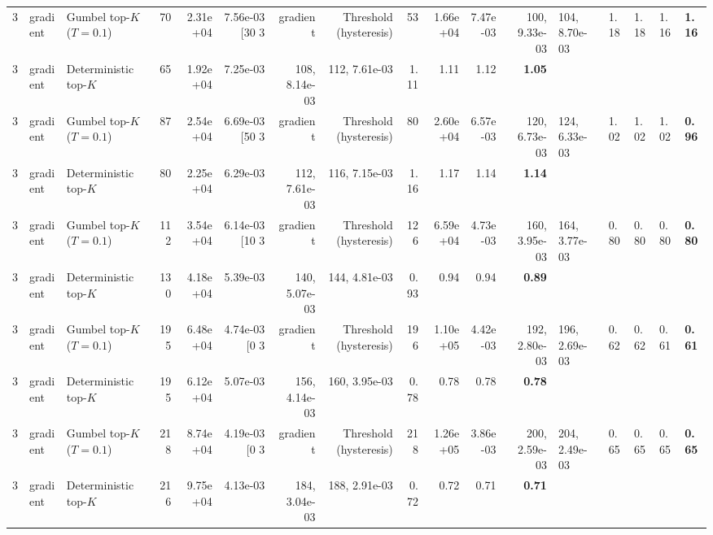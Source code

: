 \begin{tabular}{rllrrrrrrrrr}
3 & gradient & Gumbel top-$K$ ($T=0.1$) & 70 & 2.31e+04 & 7.56e-03 [30%
3 & gradient & Threshold (hysteresis) & 53 & 1.66e+04 & 7.47e-03 & 100, 9.33e-03 & 104, 8.70e-03 & 1.18 & 1.18 & 1.16 & \textbf{1.16} \\
3 & gradient & Deterministic top-$K$ & 65 & 1.92e+04 & 7.25e-03 & 108, 8.14e-03 & 112, 7.61e-03 & 1.11 & 1.11 & 1.12 & \textbf{1.05} \\
3 & gradient & Gumbel top-$K$ ($T=0.1$) & 87 & 2.54e+04 & 6.69e-03 [50%
3 & gradient & Threshold (hysteresis) & 80 & 2.60e+04 & 6.57e-03 & 120, 6.73e-03 & 124, 6.33e-03 & 1.02 & 1.02 & 1.02 & \textbf{0.96} \\
3 & gradient & Deterministic top-$K$ & 80 & 2.25e+04 & 6.29e-03 & 112, 7.61e-03 & 116, 7.15e-03 & 1.16 & 1.17 & 1.14 & \textbf{1.14} \\
3 & gradient & Gumbel top-$K$ ($T=0.1$) & 112 & 3.54e+04 & 6.14e-03 [10%
3 & gradient & Threshold (hysteresis) & 126 & 6.59e+04 & 4.73e-03 & 160, 3.95e-03 & 164, 3.77e-03 & 0.80 & 0.80 & 0.80 & \textbf{0.80} \\
3 & gradient & Deterministic top-$K$ & 130 & 4.18e+04 & 5.39e-03 & 140, 5.07e-03 & 144, 4.81e-03 & 0.93 & 0.94 & 0.94 & \textbf{0.89} \\
3 & gradient & Gumbel top-$K$ ($T=0.1$) & 195 & 6.48e+04 & 4.74e-03 [0%
3 & gradient & Threshold (hysteresis) & 196 & 1.10e+05 & 4.42e-03 & 192, 2.80e-03 & 196, 2.69e-03 & 0.62 & 0.62 & 0.61 & \textbf{0.61} \\
3 & gradient & Deterministic top-$K$ & 195 & 6.12e+04 & 5.07e-03 & 156, 4.14e-03 & 160, 3.95e-03 & 0.78 & 0.78 & 0.78 & \textbf{0.78} \\
3 & gradient & Gumbel top-$K$ ($T=0.1$) & 218 & 8.74e+04 & 4.19e-03 [0%
3 & gradient & Threshold (hysteresis) & 218 & 1.26e+05 & 3.86e-03 & 200, 2.59e-03 & 204, 2.49e-03 & 0.65 & 0.65 & 0.65 & \textbf{0.65} \\
3 & gradient & Deterministic top-$K$ & 216 & 9.75e+04 & 4.13e-03 & 184, 3.04e-03 & 188, 2.91e-03 & 0.72 & 0.72 & 0.71 & \textbf{0.71} \\

\end{tabular}
